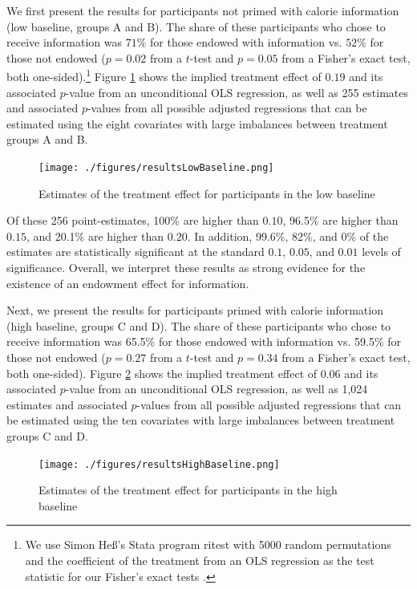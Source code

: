 \documentclass[12pt]{article}
\begin{document}
We first present the results for participants not primed with calorie information (low baseline, groups A and B). The share of these participants who chose to receive information was $71\%$ for those endowed with information vs. $52\%$ for those not endowed ($p=0.02$ from a $t$-test and $p=0.05$ from a Fisher’s exact test,  both one-sided).\footnote{We use Simon Heß’s Stata program ritest \citep{hessRandomizationInferenceStata2017} with 5000 random permutations and the coefficient of the treatment from an OLS regression as the test statistic for our Fisher’s exact tests \citet{imbensCausalInferenceStatistics2015}.} Figure \ref{fig:resultsLowBaseline} shows the implied treatment effect of $0.19$ and its associated $p$-value from an unconditional OLS regression, as well as 255 estimates and associated $p$-values from all possible adjusted regressions that can be estimated using the eight covariates with large imbalances between treatment groups A and B.

\begin{figure}[ht]
  \caption{Estimates of the treatment effect for participants in the low baseline}\label{fig:resultsLowBaseline}
  \begin{center}
  {\texttt{[image: ./figures/resultsLowBaseline.png]}}
  \end{center}
\end{figure}

Of these 256 point-estimates, 100\% are higher than $0.10$, 96.5\% are higher than $0.15$, and 20.1\% are higher than $0.20$. In addition, 99.6\%, 82\%, and 0\% of the estimates are statistically significant at the standard $0.1$, $0.05$, and $0.01$ levels of significance. Overall, we interpret these results as strong evidence for the existence of an endowment effect for information.

Next, we present the results for participants primed with calorie information (high baseline, groups C and D). The share of these participants who chose to receive information was 65.5\% for those endowed with information vs. 59.5\% for those not endowed ($p=0.27$ from a $t$-test and $p=0.34$ from a Fisher’s exact test, both one-sided). Figure \ref{fig:resultsHighBaseline} shows the implied treatment effect of $0.06$ and its associated $p$-value from an unconditional OLS regression, as well as 1,024 estimates and associated $p$-values from all possible adjusted regressions that can be estimated using the ten covariates with large imbalances between treatment groups C and D.

\begin{figure}[ht]
  \caption{Estimates of the treatment effect for participants in the high baseline}\label{fig:resultsHighBaseline}
  \begin{center}
  {\texttt{[image: ./figures/resultsHighBaseline.png]}}
  \end{center}
\end{figure}
\end{document}

